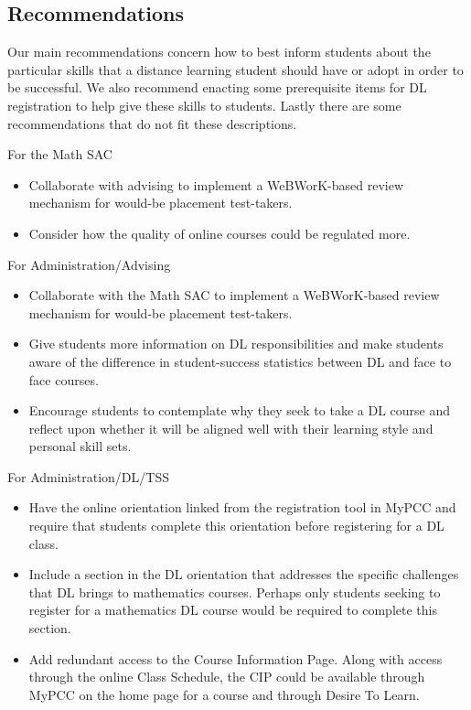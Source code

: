 \subsection{Recommendations}
Our main recommendations concern how to best inform students about the particular skills that a distance learning student should have or adopt in order to be successful. We also recommend enacting some prerequisite items for DL registration to help give these skills to students. Lastly there are some recommendations that do not fit these descriptions.
\begin{description}
\item For the Math SAC
\begin{itemize}
\item Collaborate with advising to implement a WeBWorK-based review mechanism for would-be placement test-takers.
\item Consider how the quality of online courses could be regulated more. 
\end{itemize}
\item For Administration/Advising
\begin{itemize}
\item Collaborate with the Math SAC to implement a WeBWorK-based review mechanism for would-be placement test-takers.
\item Give students more information on DL responsibilities and make students aware of the difference in student-success statistics between DL and face to face courses.
\item Encourage students to contemplate why they seek to take a DL course and reflect upon whether it will be aligned well with their learning style and personal skill sets.
\end{itemize}
\item For Administration/DL/TSS
\begin{itemize}
\item Have the online orientation linked from the registration tool in MyPCC and require that students complete this orientation before registering for a DL class.
\item Include a section in the DL orientation that addresses the specific challenges that DL brings to mathematics courses. Perhaps only students seeking to register for a mathematics DL course would be required to complete this section.
\item Add redundant access to the Course Information Page. Along with access through the online Class Schedule, the CIP could be available through MyPCC on the home page for a course and through Desire To Learn.

\end{itemize}
\end{description}
